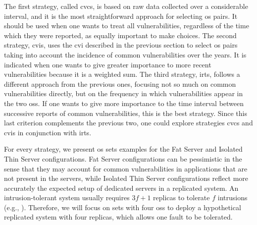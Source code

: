 The first strategy, called \gls{cvcs}, is based on raw data collected over a considerable interval, and it is the most straightforward approach for selecting \gls{os} pairs. 
It should be used when one wants to treat all vulnerabilities, regardless of the time which they were reported, as equally important to make choices. 
The second strategy, \gls{cvis}, uses the \gls{cvi} described in the previous section to select \gls{os} pairs taking into account the incidence of common vulnerabilities over the years. 
It is indicated when one wants to give greater importance to more recent vulnerabilities because it is a weighted sum. 
The third strategy, \gls{irts}, follows a different approach from the previous ones, focusing not so much on common vulnerabilities directly, but on the frequency in which vulnerabilities appear in the two \glspl{os}. 
If one wants to give more importance to the time interval between successive reports of common vulnerabilities, this is the best strategy. 
Since this last criterion complements the previous two, one could explore strategies \gls{cvcs} and \gls{cvis} in conjunction with \gls{irts}.

For every strategy, we present \gls{os} sets examples for the Fat Server and Isolated Thin Server configurations. 
Fat Server configurations can be pessimistic in the sense that they may account for common vulnerabilities in applications that are not present in the servers, while Isolated Thin Server configurations reflect more accurately the expected setup of dedicated servers in a replicated system. 
An intrusion-tolerant system usually requires $3f+1$ replicas to tolerate $f$ intrusions (e.g., \cite{Castro:2002}). 
Therefore, we will focus on sets with four \glspl{os} to deploy a hypothetical replicated system with four replicas, which allows one fault to be tolerated.

